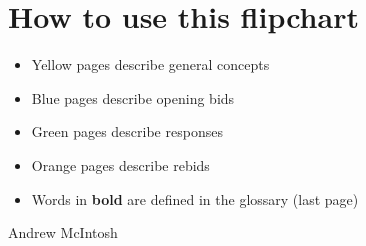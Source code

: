 \documentclass[14pt]{extarticle}
\begin{document}
\addtocounter{page}{1}
 \vspace*{\fill}
\begingroup
\centering
\section*{How to use this flipchart} 

\begin{itemize}
\item \colorbox{acolyellow}{\color{black}Yellow pages describe general concepts}
\item \colorbox{acolblue}{\color{black}Blue pages describe opening bids}
\item \colorbox{acolgreen}{\color{black}Green pages describe responses}
\item \colorbox{acolorange}{\color{black}Orange pages describe rebids}
\item Words in \textbf{bold} are defined in the glossary (last page)
\end{itemize}
\endgroup
\vspace*{\fill}
\begin{flushbottom}
 \begin{center}
 \tiny
 \textcopyright Andrew McIntosh
\end{center}
\end{flushbottom}
\end{document}
